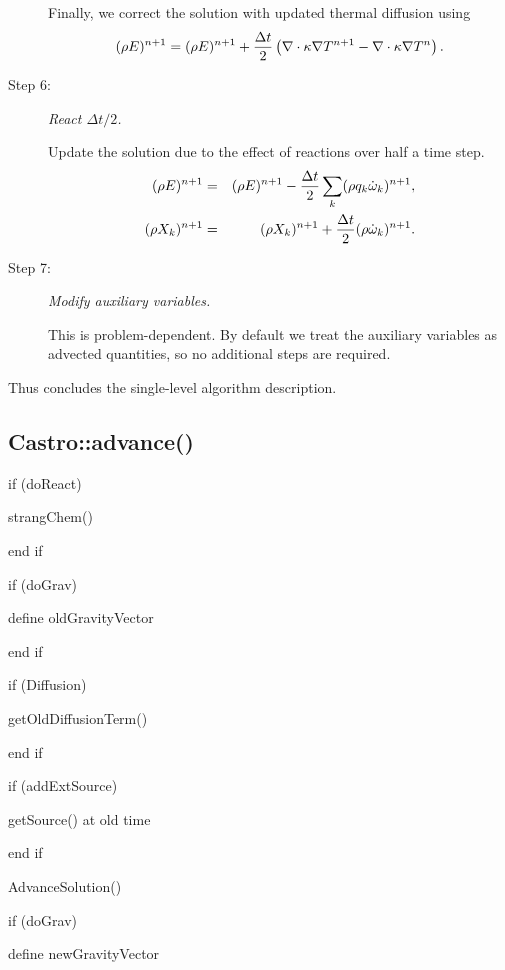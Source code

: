 \begin{description}
Finally, we correct the solution with updated thermal diffusion using
\begin{equation}
(\rho E)^{n+1} = (\rho E)^{n+1} + \frac{\Delta t}{2}\left(\nabla\cdot\kappa\nabla T^{n+1} - \nabla\cdot\kappa\nabla T^n\right).
\end{equation}
\item[Step 6:] {\em React $\Delta t/2$.}

Update the solution due to the effect of reactions over half a time step.
\begin{eqnarray}
(\rho E)^{n+1} &=& (\rho E)^{n+1} - \frac{\Delta t}{2}\sum_k(\rho q_k\dot\omega_k)^{n+1},\\
(\rho X_k)^{n+1} &=& (\rho X_k)^{n+1} + \frac{\Delta t}{2}(\rho\dot\omega_k)^{n+1}.
\end{eqnarray}
\item[Step 7:] {\em Modify auxiliary variables.}

This is problem-dependent.  By default we treat the auxiliary
variables as advected quantities, so no additional steps are required.
\end{description}
Thus concludes the single-level algorithm description.

\subsection{Castro::advance()}

\noindent

if (doReact)

\hspace{.1in}  strangChem()

end if

if (doGrav)

\hspace{.1in}  define oldGravityVector

end if

if (Diffusion)

\hspace{.1in}  getOldDiffusionTerm()

end if

if (addExtSource)

\hspace{.1in}  getSource() at old time

end if

AdvanceSolution()

if (doGrav)

\hspace{.1in}  define newGravityVector

